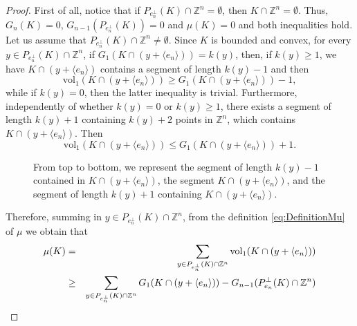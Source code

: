 \documentclass[10pt]{amsart}
\def\Z{\mathbb{Z}}
\def\vol{\mathrm{vol}}
\numberwithin{equation}{section}
\begin{document}
\begin{proof}
First of all, notice that if $P_{e_n^\perp}(K)\cap\Z^n=\emptyset$, then $K\cap\Z^n=\emptyset$. Thus, $G_n(K)=0$, $G_{n-1}(P_{e_n^\perp}(K))=0$ and $\mu(K)=0$ and both inequalities hold. Let us assume that $P_{e_n^\perp}(K)\cap\Z^n\neq\emptyset$. Since $K$ is bounded and convex, for every $y\in P_{e_n^\perp}(K)\cap\Z^n$, if $G_1(K\cap(y+\langle e_n\rangle))=k(y)$, then, if $k(y)\geq 1$, we have $K\cap(y+\langle e_n\rangle)$ contains a segment of length $k(y)-1$ and then
$$
\vol_1(K\cap(y+\langle e_n\rangle))\geq G_1(K\cap(y+\langle e_n\rangle))-1,
$$
while if $k(y)=0$, then the latter inequality is trivial. Furthermore, independently of whether $k(y)=0$ or $k(y)\geq 1$, there exists a segment of length $k(y)+1$ containing $k(y)+2$ points in $\Z^n$, which contains $K\cap(y+\langle e_n\rangle)$. Then
$$
\vol_1(K\cap(y+\langle e_n\rangle))\leq G_1(K\cap(y+\langle e_n\rangle))+1.
$$
\begin{figure}
\begin{center}
\end{center}
\caption{From top to bottom, we represent the segment of length $k(y)-1$ contained in $K\cap(y+\langle e_n\rangle)$, the segment $K\cap(y+\langle e_n\rangle)$, and the segment of length $k(y)+1$ containing $K\cap(y+\langle e_n\rangle)$.}\label{fig:1}
\end{figure}
Therefore, summing in $y\in P_{e_n^\perp}(K)\cap\Z^n$, from the definition \eqref{eq:DefinitionMu} of $\mu$ we obtain that
\begin{eqnarray*}
\mu(K)&=&\sum_{y\in P_{e_n^\perp}(K)\cap\Z^n}\vol_1(K\cap(y+\langle e_n\rangle))\cr
&\geq&\sum_{y\in P_{e_n^\perp}(K)\cap\Z^n} G_1(K\cap(y+\langle e_n\rangle))-G_{n-1}(P_{e_n}^\perp(K)\cap\Z^n)

\end{eqnarray*}
\end{proof}
\end{document}
